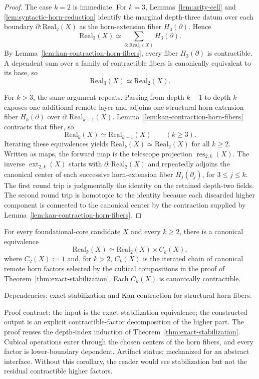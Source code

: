\documentclass{lmcs}
\newcommand{\res}{\operatorname{res}}
\newcommand{\ext}{\operatorname{ext}}
\begin{document}
\begin{proof}
The case \(k=2\) is immediate.  For \(k=3\), Lemmas~\ref{lem:arity-cell} and
\ref{lem:syntactic-horn-reduction} identify the marginal depth-three datum over each
boundary \(\partial:\mathrm{Real}_2(X)\) as the horn-extension fiber \(H_3(\partial)\).  Hence
\[
  \mathrm{Real}_3(X)
  \simeq
  \sum_{\partial:\mathrm{Real}_2(X)} H_3(\partial).
\]
By Lemma~\ref{lem:kan-contraction-horn-fibers}, every fiber \(H_3(\partial)\) is
contractible.  A dependent sum over a family of contractible fibers is canonically equivalent
to its base, so
\[
  \mathrm{Real}_3(X) \simeq \mathrm{Real}_2(X).
\]

For \(k>3\), the same argument repeats.  Passing from depth \(k-1\) to depth \(k\) exposes
one additional remote layer and adjoins one structural horn-extension fiber \(H_k(\partial)\)
over \(\partial:\mathrm{Real}_{k-1}(X)\).  Lemma~\ref{lem:kan-contraction-horn-fibers}
contracts that fiber, so
\[
  \mathrm{Real}_k(X) \simeq \mathrm{Real}_{k-1}(X)
  \qquad (k\geq 3).
\]
Iterating these equivalences yields \(\mathrm{Real}_k(X)\simeq\mathrm{Real}_2(X)\) for all
\(k\geq 2\).  Written as maps, the forward map is the telescope projection
\(\res_{2,k}(X)\).  The inverse \(\ext_{2,k}(X)\) starts with
\(\partial:\mathrm{Real}_2(X)\) and repeatedly adjoins the canonical center of each
successive horn-extension fiber \(H_j(\partial_j)\), for \(3\leq j\leq k\).
The first round trip is judgmentally the identity on the retained depth-two
fields.  The second round trip is homotopic to the identity because each
discarded higher component is connected to the canonical center by the
contraction supplied by Lemma~\ref{lem:kan-contraction-horn-fibers}.
\end{proof}

\begin{cor}
\label{cor:contractible-factor-decomposition}
For every foundational-core candidate \(X\) and every \(k\geq 2\), there is a canonical
equivalence
\[
  \mathrm{Real}_k(X)
  \simeq
  \mathrm{Real}_2(X) \times C_k(X),
\]
where \(C_2(X):=1\) and, for \(k>2\), \(C_k(X)\) is the iterated chain of canonical remote
horn factors selected by the cubical compositions in the proof of
Theorem~\ref{thm:exact-stabilization}.  Each \(C_k(X)\) is canonically contractible.

Dependencies: exact stabilization and Kan contraction for structural horn fibers.

Proof contract: the input is the exact-stabilization equivalence; the
constructed output is an explicit contractible-factor decomposition of the
higher part.  The proof reuses the depth-index induction of
Theorem~\ref{thm:exact-stabilization}.  Cubical operations enter through the
chosen centers of the horn fibers, and every factor is lower-boundary
dependent.  Artifact status: mechanized for an abstract interface.  Without
this corollary, the reader would see stabilization but not the residual
contractible higher factors.
\end{cor}
\end{document}
